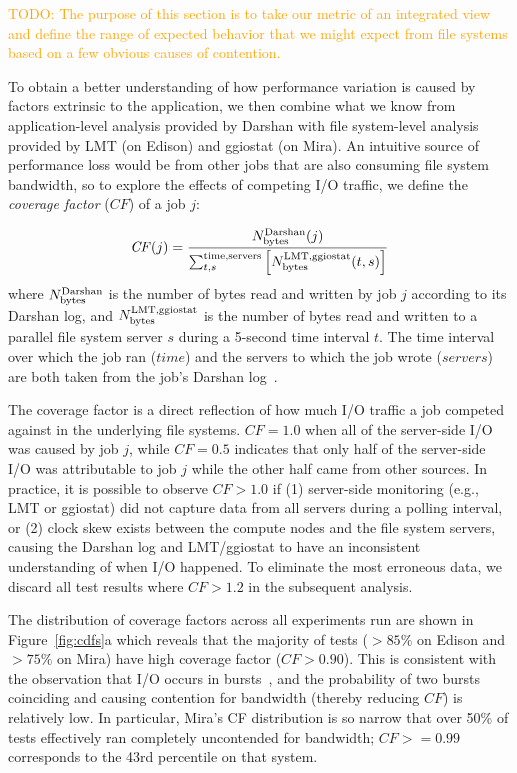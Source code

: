 \documentclass[conference,10pt,compsocconf]{IEEEtran}
\newcommand{\todo}[1]{\textcolor{Orange}{TODO: #1}}
\begin{document}
\todo{The purpose of this section is to take our metric of an integrated view and define the range of expected behavior that we might expect from file systems based on a few obvious causes of contention.}

To obtain a better understanding of how performance variation is caused by factors extrinsic to the application, we then combine what we know from application-level analysis provided by Darshan with file system-level analysis provided by LMT (on Edison) and ggiostat (on Mira).  An intuitive source of performance loss would be from other jobs that are also consuming file system bandwidth, so to explore the effects of competing I/O traffic, we define the \emph{coverage factor} ($\mathit{CF}$) of a job $j$:

\begin{equation} \label{eq:cf}
	\mathit{CF}(j) = \frac{N_{\textup{bytes}}^{\textup{Darshan}}(j)}
	{\sum_{t,s}^{\textup{time,servers}}
	\left [ N_{\textup{bytes}}^{\textup{LMT,ggiostat}}(t,s) \right ] }
\end{equation}
%
where $N_{\textup{bytes}}^{\textup{Darshan}}$ is the number of bytes read and written by job $j$ according to its Darshan log, and $N_{\textup{bytes}}^{\textup{LMT,ggiostat}}$ is the number of bytes read and written to a parallel file system server $s$ during a 5-second time interval $t$.  The time interval over which the job ran ($\mathit{time}$) and the servers to which the job wrote ($\mathit{servers}$) are both taken from the job's Darshan log~\cite{snyder2016modular}.

The coverage factor is a direct reflection of how much I/O traffic a job
competed against in the underlying file systems.  $CF = 1.0$ when
all of the server-side I/O was caused by job $j$, while $CF = 0.5$ indicates that only half of the server-side I/O was attributable to job $j$ while the other half came from other sources.  In practice, it is possible to observe $CF > 1.0$ 
if (1) server-side monitoring (e.g., LMT or ggiostat)
did not capture data from all servers during a polling interval, or (2) clock skew exists between the compute nodes and the file system servers, causing the Darshan log and LMT/ggiostat to have an inconsistent understanding of when I/O happened.  To eliminate the most erroneous data, we discard all test results where $CF > 1.2$ in the subsequent analysis.

The distribution of coverage factors across all experiments run are shown in
Figure~\ref{fig:cdfs}a which reveals that the majority of tests
($> 85\%$ on Edison and $> 75\%$ on Mira) have high coverage factor
($CF > 0.90$).  This is consistent with the observation that I/O occurs in
bursts~\cite{Carns2011,Liu2016}, and the probability of two bursts coinciding
and causing contention for bandwidth (thereby reducing $CF$) is relatively low.  In particular, Mira's CF distribution is so narrow that over 50\% of tests effectively ran completely uncontended for bandwidth; $\textit{CF} >= 0.99$ corresponds to the 43rd percentile on that system.
\end{document}
